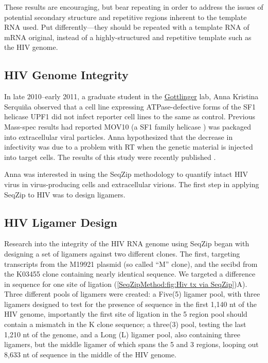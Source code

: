      These results are encouraging, but bear repeating in order to address the issues of potential secondary structure and repetitive regions inherent to the template RNA used. Put differently---they should be repeated with a template RNA of mRNA original, instead of a highly-structured and repetitive template such as the HIV genome.

  \subsection{HIV Genome Integrity}
    \label{SeqZipMethod:subsec: Why use SeqZip to look at HIV genomes}

    In late 2010--early 2011, a graduate student in the \href{http://profiles.umassmed.edu/profiles/display/133484}{Gottlinger} lab, Anna Kristina Serquiña observed that a cell line expressing ATPase-defective forms of the SF1 helicase UPF1 \citep{Bhattacharya2000} did not infect reporter cell lines to the same as control. Previous Mass-spec results had reported MOV10 (a SF1 family helicase \citep{Gregersen2014}) was packaged into extracellular viral particles. Anna hypothesized that the decrease in infectivity was due to a problem with RT when the genetic material is injected into target cells. The results of this study were recently published \citep{Serquina2013}.

    Anna was interested in using the SeqZip methodology to quantify intact HIV virus in virus-producing cells and extracellular virions. The first step in applying SeqZip to HIV was to design ligamers.

	\subsection{HIV Ligamer Design}
    \label{SeqZipMethod:subsec: Design of HIV ligamers}

	  Research into the integrity of the HIV RNA genome using SeqZip began with designing a set of ligamers against two different clones. The first, targeting transcripts from the M19921 plasmid (so called ``M'' clone), and the secibd from the K03455 clone containing nearly identical sequence. We targeted a difference in sequence for one site of ligation (\ref{SeqZipMethod:fig:Hiv tx via SeqZip})A). Three different pools of ligamers were created: a Five(5) ligamer pool, with three ligamers designed to test for the presence of sequence in the first 1,140 nt of the HIV genome, importantly the first site of ligation in the 5 region pool should contain a mismatch in the K clone sequence; a three(3) pool, testing the last 1,210 nt of the genome, and a Long (L) ligamer pool, also containing three ligamers, but the middle ligamer of which spans the 5 and 3 regions, looping out 8,633 nt of sequence in the middle of the HIV genome. 

